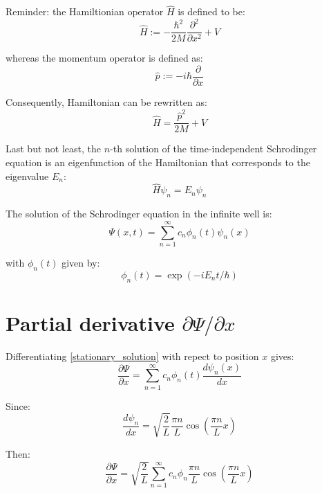 \documentclass[12pt]{article}
\begin{document}
\noindent Reminder: the Hamiltionian operator $\hat{H}$ is defined to be:
\begin{equation*}
\hat{H} := - \frac{\hbar^2}{2M}\frac{\partial^2}{\partial x^2} + V
\end{equation*}

\noindent whereas the momentum operator is defined as:
\begin{equation}
\hat{p} := -i \hbar \frac{\partial}{\partial x}
\end{equation}

\noindent Consequently, Hamiltonian can be rewritten as:
\begin{equation*}
\hat{H} = \frac{\hat{p}^2}{2M} + V
\end{equation*}

\noindent Last but not least, the $n$-th solution of the time-independent Schrodinger equation is an eigenfunction of the Hamiltonian that corresponds to the eigenvalue $E_n$:
\begin{equation*}
\hat{H} \psi_n = E_n \psi_n
\end{equation*}

\noindent The solution of the Schrodinger equation in the infinite well is:
\begin{equation}
\label{solution_infinite_well}
\Psi(x, t) = \sum_{n=1}^{\infty} c_n \phi_n(t) \psi_n(x)
\end{equation}

\noindent with $\phi_n(t)$ given by:
\begin{equation}
\phi_n(t) = \exp \left( 
- i E_n t / \hbar
\right)
\end{equation}



\section{Partial derivative $\partial \Psi / \partial x$}
Differentiating \eqref{stationary_solution} with repect to position $x$ gives:
\begin{equation}
\frac{\partial \Psi}{\partial x} = \sum_{n=1}^{\infty} c_n \phi_n(t) \frac{d \psi_n(x)}{dx}
\end{equation}

\noindent Since: 
\begin{equation*}
\frac{d \psi_n}{dx} = \sqrt{\frac{2}{L}} \frac{\pi n}{L} \cos \left( \frac{\pi n}{L} x \right)
\end{equation*}

\noindent Then:
\begin{equation}
\label{derivative_psi_wrt_x}
\frac{\partial \Psi}{\partial x} = \sqrt{\frac{2}{L}} \sum_{n=1}^{\infty} c_n \phi_n \frac{\pi n}{L} \cos \left( \frac{\pi n}{L} x \right)
\end{equation}
\end{document}
